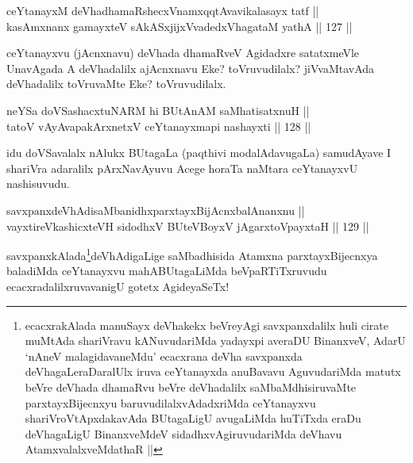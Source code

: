 
\begin{shl}
ceYtanayxM deVhadhamaRshecxVnamxqqtAvavikalasayx tatf || \\
kasAmxnanx gamayxteV sAkASxjijxVvadedxVhagataM yathA ||  127 ||  
\end{shl}

\begin{artha}
ceYtanayxvu (jAcnxnavu) deVhada dhamaRveV Agidadxre satatxmeVle UnavAgada A deVhadalilx ajAcnxnavu Eke? toVruvudilalx? jiVvaMtavAda deVhadalilx toVruvaMte Eke? toVruvudilalx.
\end{artha}


\begin{shl}
neYSa doVSashacxtuNARM hi BUtAnAM saMhatisatxnuH || \\
tatoV vAyAvapakArxnetxV ceYtanayxmapi nashayxti ||  128 ||  
\end{shl}

\begin{artha}
idu doVSavalalx nAlukx BUtagaLa (paqthivi modalAdavugaLa) samudAyave I shariVra adaralilx pArxNavAyuvu Acege horaTa naMtara ceYtanayxvU nashisuvudu. 
\end{artha}


\begin{shl}
savxpanxdeVhAdisaMbanidhxparxtayxBijAcnxbalAnanxnu || \\
vayxtireVkashicxteVH sidodhxV BUteVBoyxV jAgarxtoV\s payxtaH ||  129 ||  
\end{shl}

\begin{artha}
savxpanxkAlada\footnote{ecacxrakAlada manuSayx deVhakekx beVreyAgi savxpanxdalilx huli cirate muMtAda shariVravu kANuvudariMda yadayxpi  averaDU BinanxveV, AdarU `nAneV malagidavaneMdu' ecacxrana deVha savxpanxda deVhagaLeraDaralUlx iruva ceYtanayxda anuBavavu AguvudariMda matutx beVre deVhada dhamaRvu beVre deVhadalilx saMbaMdhisiruvaMte parxtayxBijecnxyu baruvudilalxvAdadxriMda ceYtanayxvu shariVroVtApxdakavAda BUtagaLigU avugaLiMda huTiTxda eraDu deVhagaLigU BinanxveMdeV sidadhxvAgiruvudariMda deVhavu AtamxvalalxveMdathaR ||}deVhAdigaLige saMbadhisida Atamxna parxtayxBijecnxya baladiMda ceYtanayxvu mahABUtagaLiMda beVpaRTiTxruvudu ecacxradalilxruvavanigU gotetx AgideyaSeTx!
\end{artha}


